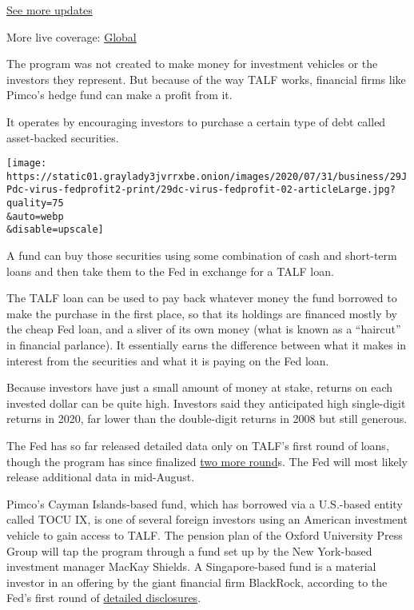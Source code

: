 \href{https://www.nytimes3xbfgragh.onion/live/2020/07/31/business/stock-market-today-coronavirus?action=click\&pgtype=Article\&state=default\&region=MAIN_CONTENT_1\&context=storylines_live_updates}{See
more updates}

More live coverage:
\href{https://www.nytimes3xbfgragh.onion/2020/08/01/world/coronavirus-covid-19.html?action=click\&pgtype=Article\&state=default\&region=MAIN_CONTENT_1\&context=storylines_live_updates}{Global}

The program was not created to make money for investment vehicles or the
investors they represent. But because of the way TALF works, financial
firms like Pimco's hedge fund can make a profit from it.

It operates by encouraging investors to purchase a certain type of debt
called asset-backed securities.

\texttt{[image: https://static01.graylady3jvrrxbe.onion/images/2020/07/31/business/29JPdc-virus-fedprofit2-print/29dc-virus-fedprofit-02-articleLarge.jpg?quality=75\\\&auto=webp\\\&disable=upscale]}

A fund can buy those securities using some combination of cash and
short-term loans and then take them to the Fed in exchange for a TALF
loan.

The TALF loan can be used to pay back whatever money the fund borrowed
to make the purchase in the first place, so that its holdings are
financed mostly by the cheap Fed loan, and a sliver of its own money
(what is known as a ``haircut'' in financial parlance). It essentially
earns the difference between what it makes in interest from the
securities and what it is paying on the Fed loan.

Because investors have just a small amount of money at stake, returns on
each invested dollar can be quite high. Investors said they anticipated
high single-digit returns in 2020, far lower than the double-digit
returns in 2008 but still generous.

The Fed has so far released detailed data only on TALF's first round of
loans, though the program has since finalized
\href{https://www.newyorkfed.org/markets/term-asset-backed-securities-loan-facility/term-asset-backed-securities-loan-facility-rates}{two
more round}s. The Fed will most likely release additional data in
mid-August.

Pimco's Cayman Islands-based fund, which has borrowed via a U.S.-based
entity called TOCU IX, is one of several foreign investors using an
American investment vehicle to gain access to TALF. The pension plan of
the Oxford University Press Group will tap the program through a fund
set up by the New York-based investment manager MacKay Shields. A
Singapore-based fund is a material investor in an offering by the giant
financial firm BlackRock, according to the Fed's first round of
\href{https://www.federalreserve.gov/reports-to-congress-covid-19.htm}{detailed
disclosures}.

